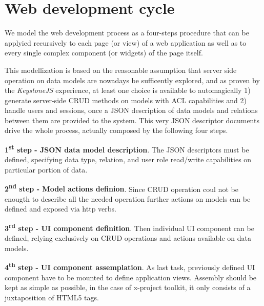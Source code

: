\section{Web development cycle}\label{sec:cycle}

We model the web development process as a four-steps procedure that can be
applyied recursively to each page (or view) of a web application as well as to
every single complex component (or widgets) of the page itself.

This modellization is based on the reasonable assumption that server side
operation on data models are nowadays be sufficently explored, and as proven by
the {\em KeystoneJS} experience, at least one choice is available to automagically  
1) generate server-side CRUD methods on models with ACL capabilities and 
2) handle users and sessions, 
once a JSON description of data models and relations between them are provided to the
system. This very JSON descriptor documents drive the whole process, actually composed
by the following four steps.


{\bf 1\textsuperscript{st} step - JSON data model description}. The JSON
descriptors must be defined, specifying data type, relation, and user role
read/write capabilities on particular portion of data.

{\bf 2\textsuperscript{nd} step - Model actions definion}. Since CRUD
operation coul not be enougth to describe all the needed operation further
actions on models can be defined and exposed via http verbs.

{\bf 3\textsuperscript{rd} step - UI component definition}. Then individual UI
component can be defined,  relying exclusively on CRUD operations and actions
available on data models.

{\bf 4\textsuperscript{th} step - UI component assemplation}. As last task,
previously defined UI component  have to be mounted to define application
views. Assembly should be kept as simple as possible, in the case of x-project
toolkit, it only consists of a juxtaposition of HTML5 tags.



